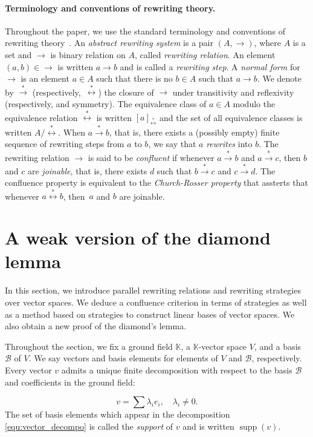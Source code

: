\documentclass[11pt]{article}
\theoremstyle{definition}
\newcommand\basis{\mathscr{B}}
\DeclareMathOperator{\supp}{supp}
\newcommand\K{\mathbb{K}}
\newcommand\transRew{\overset{*}{\to}}
\newcommand\rewEquiv{\overset{*}{\leftrightarrow}}
\begin{document}
\paragraph{Terminology and conventions of rewriting theory.}

Throughout the paper, we use the standard terminology and conventions of
rewriting theory~\cite{MR1629216}. An {\em abstract rewriting system} is
a pair $(A,\to)$, where $A$ is a set and $\to$ is binary relation on $A$,
called {\em rewriting relation}. An element~$(a,b)\in\to$ is written
$a\to b$ and is called a {\em rewriting step}. A {\em normal form} for
$\to$ is an element $a\in A$ such that there is no $b\in A$ such that
$a\to b$. We denote by $\transRew$  (respectively,~$\rewEquiv$) the
closure of $\to$ under transitivity and reflexivity (respectively, and
symmetry). The equivalence class of $a\in A$ modulo the equivalence
relation $\rewEquiv$ is written $[a]_{\rewEquiv}$ and the set of all
equivalence classes is written $A/\rewEquiv$. When $a\transRew b$, that
is, there exists a (possibly empty) finite sequence of rewriting steps
from $a$ to  $b$, we say that $a$ {\em rewrites} into $b$. The rewriting
relation $\to$ is said to be {\em confluent} if whenever $a\transRew b$
and $a\transRew c$, then $b$ and $c$ are {\em joinable}, that is, there
exists $d$ such that $b\transRew c$ and $c\transRew d$. The confluence
property is equivalent to the {\em Church-Rosser property} that assterts
that whenever $a\rewEquiv b$, then~$a$ and $b$ are joinable.

\section{A weak version of the diamond lemma}
\label{sec:a_weak_version_of_the_diamond_lemma}

In this section, we introduce parallel rewriting relations and rewriting
strategies over vector spaces. We deduce a confluence criterion in terms
of strategies as well as a method based on strategies to construct linear
bases of vector spaces. We also obtain a new proof of the diamond's
lemma.
\medskip

Throughout the section, we fix a ground field $\K$, a $\K$-vector space
$V$, and a basis $\basis$ of $V$. We say vectors and basis elements for
elements of $V$ and $\basis$, respectively. Every vector $v$ admits a
unique finite decomposition with respect to the basis $\basis$ and
coefficients in the ground field:

\begin{equation}\label{equ:vector_decompo}
  v=\sum\lambda_ie_i,\quad\lambda_i\neq 0.
\end{equation}
The set of basis elements which appear in the decomposition
\eqref{equ:vector_decompo} is called the {\it support} of $v$ and is
written $\supp(v)$. 
\end{document}
